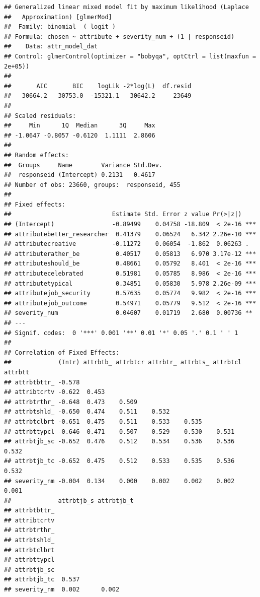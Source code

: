 \documentclass[
]{article}
\begin{document}
\begin{verbatim}
## Generalized linear mixed model fit by maximum likelihood (Laplace
##   Approximation) [glmerMod]
##  Family: binomial  ( logit )
## Formula: chosen ~ attribute + severity_num + (1 | responseid)
##    Data: attr_model_dat
## Control: glmerControl(optimizer = "bobyqa", optCtrl = list(maxfun = 2e+05))
## 
##       AIC       BIC    logLik -2*log(L)  df.resid 
##   30664.2   30753.0  -15321.1   30642.2     23649 
## 
## Scaled residuals: 
##     Min      1Q  Median      3Q     Max 
## -1.0647 -0.8057 -0.6120  1.1111  2.8606 
## 
## Random effects:
##  Groups     Name        Variance Std.Dev.
##  responseid (Intercept) 0.2131   0.4617  
## Number of obs: 23660, groups:  responseid, 455
## 
## Fixed effects:
##                            Estimate Std. Error z value Pr(>|z|)    
## (Intercept)                -0.89499    0.04758 -18.809  < 2e-16 ***
## attributebetter_researcher  0.41379    0.06524   6.342 2.26e-10 ***
## attributecreative          -0.11272    0.06054  -1.862  0.06263 .  
## attributerather_be          0.40517    0.05813   6.970 3.17e-12 ***
## attributeshould_be          0.48661    0.05792   8.401  < 2e-16 ***
## attributecelebrated         0.51981    0.05785   8.986  < 2e-16 ***
## attributetypical            0.34851    0.05830   5.978 2.26e-09 ***
## attributejob_security       0.57635    0.05774   9.982  < 2e-16 ***
## attributejob_outcome        0.54971    0.05779   9.512  < 2e-16 ***
## severity_num                0.04607    0.01719   2.680  0.00736 ** 
## ---
## Signif. codes:  0 '***' 0.001 '**' 0.01 '*' 0.05 '.' 0.1 ' ' 1
## 
## Correlation of Fixed Effects:
##             (Intr) attrbtb_ attrbtcr attrbtr_ attrbts_ attrbtcl attrbtt
## attrbtbttr_ -0.578                                                     
## attribtcrtv -0.622  0.453                                              
## attrbtrthr_ -0.648  0.473    0.509                                     
## attrbtshld_ -0.650  0.474    0.511    0.532                            
## attrbtclbrt -0.651  0.475    0.511    0.533    0.535                   
## attrbttypcl -0.646  0.471    0.507    0.529    0.530    0.531          
## attrbtjb_sc -0.652  0.476    0.512    0.534    0.536    0.536    0.532 
## attrbtjb_tc -0.652  0.475    0.512    0.533    0.535    0.536    0.532 
## severity_nm -0.004  0.134    0.000    0.002    0.002    0.002    0.001 
##             attrbtjb_s attrbtjb_t
## attrbtbttr_                      
## attribtcrtv                      
## attrbtrthr_                      
## attrbtshld_                      
## attrbtclbrt                      
## attrbttypcl                      
## attrbtjb_sc                      
## attrbtjb_tc  0.537               
## severity_nm  0.002      0.002
\end{verbatim}
\end{document}

